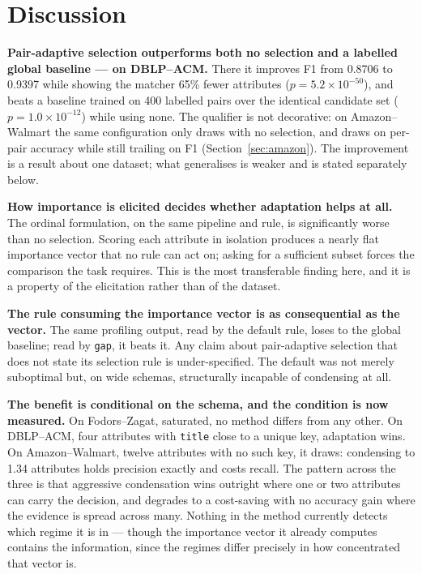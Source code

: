 \documentclass[11pt]{article}
\begin{document}
\section{Discussion}

\textbf{Pair-adaptive selection outperforms both no selection and a labelled global
baseline --- on DBLP--ACM.} There it improves F1 from 0.8706 to 0.9397 while showing the
matcher 65\% fewer attributes ($p = 5.2\times10^{-50}$), and beats a baseline trained on 400
labelled pairs over the identical candidate set ($p = 1.0\times10^{-12}$) while using none.
The qualifier is not decorative: on Amazon--Walmart the same configuration only draws with
no selection, and draws on per-pair accuracy while still trailing on F1
(Section~\ref{sec:amazon}). The improvement is a result about one dataset; what generalises
is weaker and is stated separately below.

\textbf{How importance is elicited decides whether adaptation helps at all.} The ordinal
formulation, on the same pipeline and rule, is significantly worse than no selection.
Scoring each attribute in isolation produces a nearly flat importance vector that no rule
can act on; asking for a sufficient subset forces the comparison the task requires. This is
the most transferable finding here, and it is a property of the elicitation rather than of
the dataset.

\textbf{The rule consuming the importance vector is as consequential as the vector.} The
same profiling output, read by the default rule, loses to the global baseline; read by
\texttt{gap}, it beats it. Any claim about pair-adaptive selection that does not state its
selection rule is under-specified. The default was not merely suboptimal but, on wide
schemas, structurally incapable of condensing at all.

\textbf{The benefit is conditional on the schema, and the condition is now measured.} On
Fodors--Zagat, saturated, no method differs from any other. On DBLP--ACM, four attributes
with \texttt{title} close to a unique key, adaptation wins. On Amazon--Walmart, twelve
attributes with no such key, it draws: condensing to 1.34 attributes holds precision exactly
and costs recall. The pattern across the three is that aggressive condensation wins outright
where one or two attributes can carry the decision, and degrades to a cost-saving with no
accuracy gain where the evidence is spread across many. Nothing in the method currently
detects which regime it is in --- though the importance vector it already computes contains
the information, since the regimes differ precisely in how concentrated that vector is.
\end{document}
